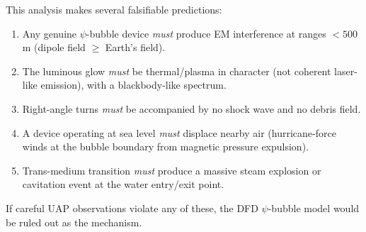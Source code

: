\documentclass[12pt,a4paper]{article}
\begin{document}
This analysis makes several falsifiable predictions:
\begin{enumerate}
\item Any genuine $\psi$-bubble device \emph{must} produce EM interference
  at ranges $< 500$\,m (dipole field $\geq$ Earth's field).
\item The luminous glow \emph{must} be thermal/plasma in character
  (not coherent laser-like emission), with a blackbody-like spectrum.
\item Right-angle turns \emph{must} be accompanied by no shock wave
  and no debris field.
\item A device operating at sea level \emph{must} displace nearby air
  (hurricane-force winds at the bubble boundary from magnetic pressure
  expulsion).
\item Trans-medium transition \emph{must} produce a massive steam
  explosion or cavitation event at the water entry/exit point.
\end{enumerate}

If careful UAP observations violate any of these, the DFD $\psi$-bubble
model would be ruled out as the mechanism.
\end{document}
